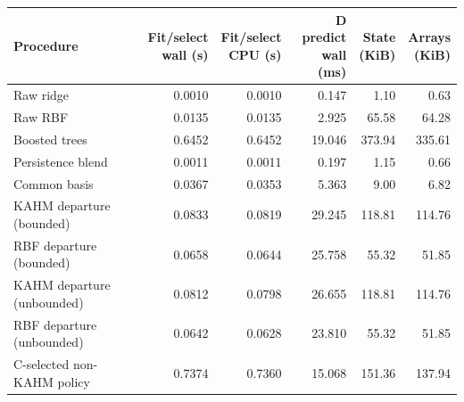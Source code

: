 \begin{tabular}{@{}lrrrrr@{}}
\toprule
Procedure & \shortstack{Fit/select\\wall (s)} & \shortstack{Fit/select\\CPU (s)} & \shortstack{D predict\\wall (ms)} & \shortstack{State\\(KiB)} & \shortstack{Arrays\\(KiB)} \\
\midrule
Raw ridge & 0.0010 & 0.0010 & 0.147 & 1.10 & 0.63 \\
Raw RBF & 0.0135 & 0.0135 & 2.925 & 65.58 & 64.28 \\
Boosted trees & 0.6452 & 0.6452 & 19.046 & 373.94 & 335.61 \\
Persistence blend & 0.0011 & 0.0011 & 0.197 & 1.15 & 0.66 \\
Common basis & 0.0367 & 0.0353 & 5.363 & 9.00 & 6.82 \\
KAHM departure (bounded) & 0.0833 & 0.0819 & 29.245 & 118.81 & 114.76 \\
RBF departure (bounded) & 0.0658 & 0.0644 & 25.758 & 55.32 & 51.85 \\
KAHM departure (unbounded) & 0.0812 & 0.0798 & 26.655 & 118.81 & 114.76 \\
RBF departure (unbounded) & 0.0642 & 0.0628 & 23.810 & 55.32 & 51.85 \\
C-selected non-KAHM policy & 0.7374 & 0.7360 & 15.068 & 151.36 & 137.94 \\
\bottomrule
\end{tabular}
